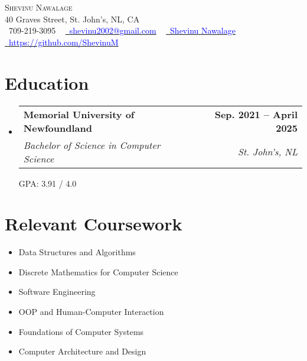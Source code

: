 \documentclass[letterpaper,11pt]{article}
\makeatletter
\newcommand{\resumeSubheading}[4]{
  \vspace{-2pt}\item
    \begin{tabular*}{1.0\textwidth}[t]{l@{\extracolsep{\fill}}r}
      \textbf{#1} & \textbf{\small #2} \\
      \textit{\small#3} & \textit{\small #4} \\
    \end{tabular*}\vspace{-7pt}
}
\newcommand{\resumeSubHeadingListStart}{\begin{itemize}[leftmargin=0.0in, label={}]}
\newcommand{\resumeSubHeadingListEnd}{\end{itemize}}
\makeatother
\begin{document}
\begin{center}
    {\Huge \scshape Shevinu Nawalage} \\ \vspace{1pt}
    40 Graves Street, St. John's, NL, CA \\ \vspace{1pt}
    \small \raisebox{-0.1\height}\faPhone\ 709-219-3095 ~ \href{mailto:shevinu2002@gmail.com}{\raisebox{-0.2\height}\faEnvelope\  {\textcolor{blue}{shevinu2002@gmail.com}}} ~ 
    \href{https://www.linkedin.com/in/shevinu-nawalage-a109371bb/}{\raisebox{-0.2\height}\faLinkedin\ {\textcolor{blue}{Shevinu Nawalage}}}  ~
    \href{https://github.com/ShevinuM}{\raisebox{-0.2\height}\faGithub\ {\textcolor{blue}{https://github.com/ShevinuM}}}
    \vspace{-8pt}
\end{center}


\section{Education}
  \resumeSubHeadingListStart
    \resumeSubheading
      {Memorial University of Newfoundland}{Sep. 2021 -- April 2025}
      {Bachelor of Science in Computer Science}{St. John's, NL}
      
      {GPA: 3.91 / 4.0}
  \resumeSubHeadingListEnd

\section{Relevant Coursework}
        \begin{multicols}{1}
            \begin{itemize}[itemsep=-5pt, parsep=3pt]
                \item\small Data Structures and Algorithms
                \item Discrete Mathematics for Computer Science
                \item Software Engineering 
                \item OOP and Human-Computer Interaction
                \item Foundations of Computer Systems
                \item Computer Architecture and Design
            \end{itemize}
        \end{multicols}
        \vspace*{2.0\multicolsep}
\end{document}
